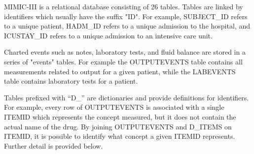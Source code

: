 \documentclass[english]{article}
\begin{document}



MIMIC-III is a relational database consisting of 26 tables. Tables are linked by identifiers which usually have the suffix "ID". For example, SUBJECT\_ID refers to a unique patient, HADM\_ID refers to a unique admission to the hospital, and ICUSTAY\_ID refers to a unique admission to an intensive care unit. 

Charted events such as notes, laboratory tests, and fluid balance are stored in a series of "events" tables. For example the OUTPUTEVENTS table contains all measurements related to output for a given patient, while the LABEVENTS table contains laboratory tests for a patient.

Tables prefixed with “D\_” are dictionaries and provide definitions for identifiers. For example, every row of OUTPUTEVENTS is associated with a single ITEMID which represents the concept measured, but it does not contain the actual name of the drug. By joining OUTPUTEVENTS and D\_ITEMS on ITEMID, it is possible to identify what concept a given ITEMID represents. Further detail is provided below.
\end{document}
